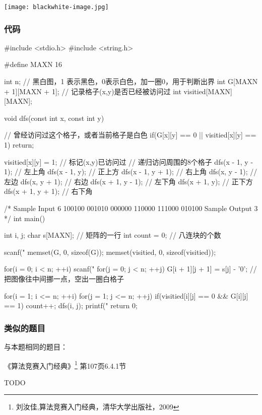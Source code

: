 \begin{center}
\texttt{[image: blackwhite-image.jpg]}\\
\label{fig:blackwhiteImage}
\end{center}

\subsubsection{代码}
\begin{Codex}[label=blackwhite_image.c]
#include <stdio.h>
#include <string.h>

#define MAXN 16

int n;
// 黑白图，1 表示黑色，0表示白色，加一圈0，用于判断出界
int G[MAXN + 1][MAXN + 1];
// 记录格子(x,y)是否已经被访问过
int visitied[MAXN][MAXN];

void dfs(const int x, const int y) {
    // 曾经访问过这个格子，或者当前格子是白色
    if(G[x][y] == 0 || visitied[x][y] == 1)  return;
    
    visitied[x][y] = 1; // 标记(x,y)已访问过
    // 递归访问周围的8个格子
    dfs(x - 1, y - 1); // 左上角
    dfs(x - 1, y); // 正上方
    dfs(x - 1, y + 1); // 右上角
    dfs(x, y - 1); // 左边
    dfs(x, y + 1); // 右边
    dfs(x + 1, y - 1); // 左下角
    dfs(x + 1, y); // 正下方
    dfs(x + 1, y + 1); // 右下角
}

/*
Sample Input
6
100100
001010
000000
110000
111000
010100
Sample Output
3
*/
int main() {
    int i, j;
    char s[MAXN]; // 矩阵的一行
    int count = 0; // 八连块的个数

    scanf("%
    memset(G, 0, sizeof(G));
    memset(visitied, 0, sizeof(visitied));

    for(i = 0; i < n; ++i) {
        scanf("%
        for(j = 0; j < n; ++j) {
            G[i + 1][j + 1] = s[j] - '0'; // 把图像往中间挪一点，空出一圈白格子
        }
    }


    for(i = 1; i <= n; ++i) {
        for(j = 1; j <= n; ++j) {
            if(visitied[i][j] == 0 && G[i][j] == 1) {
                count++;
                dfs(i, j);
            }
        }
    }
    printf("%
    return 0;
}
\end{Codex}

\subsubsection{类似的题目}
与本题相同的题目：
\begindot
\item 《算法竞赛入门经典》\footnote{刘汝佳,算法竞赛入门经典，清华大学出版社，2009} 第107页6.4.1节
\item  TODO
\myenddot

